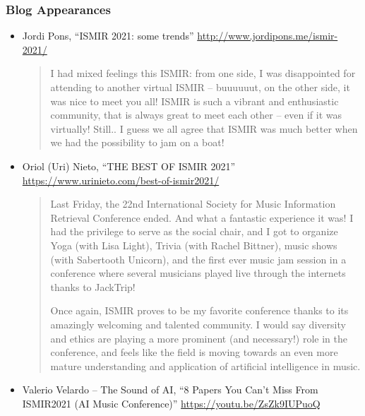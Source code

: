 \documentclass[%
10pt,								%
]
{scrartcl}
\begin{document}
        \subsubsection{Blog Appearances}
            \begin{itemize}
                \item   Jordi Pons, ``ISMIR 2021: some trends'' \href{http://www.jordipons.me/ismir-2021/}{http://www.jordipons.me/ismir-2021/ }
                
                    \begin{quote}
                        I had mixed feelings this ISMIR: from one side, I was disappointed for attending to another virtual ISMIR – buuuuuut, on the other side, it was nice to meet you all! ISMIR is such a vibrant and enthusiastic community, that is always great to meet each other – even if it was virtually! Still.. I guess we all agree that ISMIR was much better when we had the possibility to jam on a boat! 
                    \end{quote}
                    
                \item   Oriol (Uri) Nieto, ``THE BEST OF ISMIR 2021'' \href{https://www.urinieto.com/best-of-ismir2021/ }{https://www.urinieto.com/best-of-ismir2021/ }
                
                    \begin{quote}
                        Last Friday, the 22nd International Society for Music Information Retrieval Conference ended. And what a fantastic experience it was! I had the privilege to serve as the social chair, and I got to organize Yoga (with Lisa Light), Trivia (with Rachel Bittner), music shows (with Sabertooth Unicorn), and the first ever music jam session in a conference where several musicians played live through the internets thanks to JackTrip!

Once again, ISMIR proves to be my favorite conference thanks to its amazingly welcoming and talented community. I would say diversity and ethics are playing a more prominent (and necessary!) role in the conference, and feels like the field is moving towards an even more mature understanding and application of artificial intelligence in music.
                    \end{quote}

                \item   Valerio Velardo -- The Sound of AI, ``8 Papers You Can’t Miss From ISMIR2021 (AI Music Conference)'' \href{https://youtu.be/ZsZk9IUPuoQ}{https://youtu.be/ZsZk9IUPuoQ}
                

\end{itemize}
\end{document}
